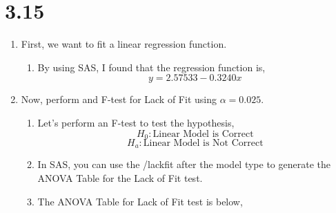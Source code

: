 \documentclass{article}
\begin{document}
\section*{3.15}
	\begin{enumerate}[label = \alph*)]
		\item First, we want to fit a linear regression function.
		\begin{enumerate}[label = \arabic*)]
			\item By using SAS, I found that the regression function is,
			\[y = 2.57533 - 0.3240x\]
		\end{enumerate}
		\item Now, perform and F-test for Lack of Fit using $\alpha = 0.025$.
		\begin{enumerate}[label = \arabic*)]
			\item Let's perform an F-test to test the hypothesis,
			\[H_0: \text{Linear Model is Correct}\]
			\[H_a: \text{Linear Model is Not Correct}\]
			\item In SAS, you can use the /lackfit after the model type to generate the ANOVA Table for the Lack of Fit test.
			\item The ANOVA Table for Lack of Fit test is below,
			

\end{enumerate}
\end{enumerate}
\end{document}
